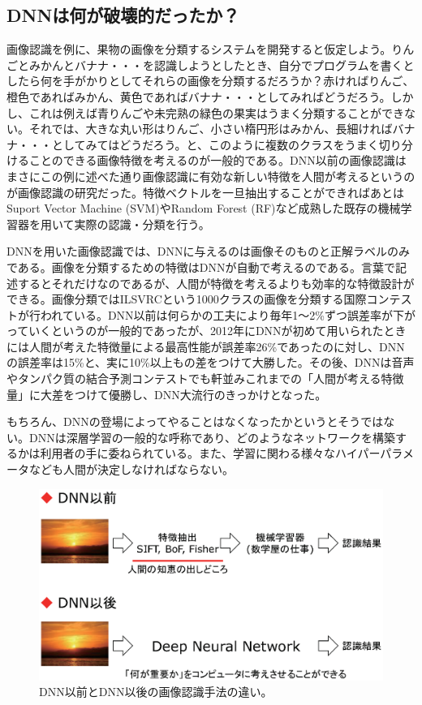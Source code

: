 \subsection{DNNは何が破壊的だったか？}
画像認識を例に、果物の画像を分類するシステムを開発すると仮定しよう。りんごとみかんとバナナ・・・を認識しようとしたとき、自分でプログラムを書くとしたら何を手がかりとしてそれらの画像を分類するだろうか？赤ければりんご、橙色であればみかん、黄色であればバナナ・・・としてみればどうだろう。しかし、これは例えば青りんごや未完熟の緑色の果実はうまく分類することができない。それでは、大きな丸い形はりんご、小さい楕円形はみかん、長細ければバナナ・・・としてみてはどうだろう。と、このように複数のクラスをうまく切り分けることのできる画像特徴を考えるのが一般的である。DNN以前の画像認識はまさにこの例に述べた通り画像認識に有効な新しい特徴を人間が考えるというのが画像認識の研究だった。特徴ベクトルを一旦抽出することができればあとはSuport Vector Machine (SVM)やRandom Forest (RF)など成熟した既存の機械学習器を用いて実際の認識・分類を行う。

DNNを用いた画像認識では、DNNに与えるのは画像そのものと正解ラベルのみである。画像を分類するための特徴はDNNが自動で考えるのである。言葉で記述するとそれだけなのであるが、人間が特徴を考えるよりも効率的な特徴設計ができる。画像分類ではILSVRCという1000クラスの画像を分類する国際コンテストが行われている。DNN以前は何らかの工夫により毎年1～2\%ずつ誤差率が下がっていくというのが一般的であったが、2012年にDNNが初めて用いられたときには人間が考えた特徴量による最高性能が誤差率26\%であったのに対し、DNNの誤差率は15\%と、実に10\%以上もの差をつけて大勝した。その後、DNNは音声やタンパク質の結合予測コンテストでも軒並みこれまでの「人間が考える特徴量」に大差をつけて優勝し、DNN大流行のきっかけとなった。

もちろん、DNNの登場によってやることはなくなったかというとそうではない。DNNは深層学習の一般的な呼称であり、どのようなネットワークを構築するかは利用者の手に委ねられている。また、学習に関わる様々なハイパーパラメータなども人間が決定しなければならない。

\begin{figure}[ht]
	\begin{center}
		\includegraphics[width=0.7\linewidth] {images/YamasakiLab/introduction/before_after_dnn.eps}
		\caption{DNN以前とDNN以後の画像認識手法の違い。}
		\label{fig:accuracy}
	\end{center}
\end{figure}


